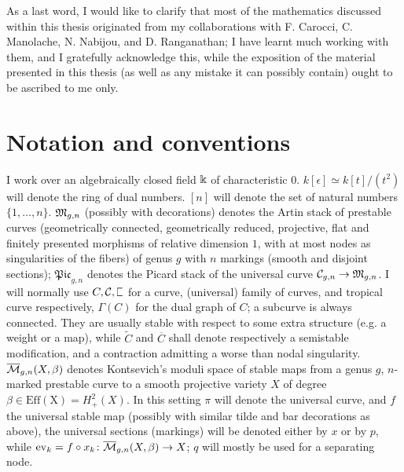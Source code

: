 As a last word, I would like to clarify that most of the mathematics discussed within this thesis originated from my collaborations with F. Carocci, C. Manolache, N. Nabijou, and D. Ranganathan; I have learnt much working with them, and I gratefully acknowledge this, while the exposition of the material presented in this thesis (as well as any mistake it can possibly contain) ought to be ascribed to me only.

\section*{Notation and conventions}
I work over an algebraically closed field $\Bbbk$ of characteristic $0$. $k[\epsilon]\simeq k[t]/(t^2)$ will denote the ring of dual numbers. $[n]$ will denote the set of natural numbers $\{1,\ldots,n\}$. $\mathfrak M_{g,n}$ (possibly with decorations) denotes the Artin stack of prestable curves (geometrically connected, geometrically reduced, projective, flat and finitely presented morphisms of relative dimension $1$, with at most nodes as singularities of the fibers) of genus $g$ with $n$ markings (smooth and disjoint sections); $\mathfrak{Pic}_{g,n}$ denotes the Picard stack of the universal curve $\mathcal C_{g,n}\rightarrow\mathfrak M_{g,n}$. I will normally use $C,\mathcal C,\plC$ for a curve, (universal) family of curves, and tropical curve respectively, $\Gamma(C)$ for the dual graph of $C$; a subcurve is always connected. They are usually stable with respect to some extra structure (e.g. a weight or a map), while $\widetilde{C}$ and $\overline{C}$ shall denote respectively a semistable modification, and a contraction admitting a worse than nodal singularity. $\overline{\mathcal{M}}_{g,n}(X,\beta)$ denotes Kontsevich's moduli space of stable maps from a genus $g$, $n$-marked prestable curve to a smooth projective variety $X$ of degree $\beta\in\operatorname{Eff(X)}=H^2_+(X)$. In this setting $\pi$ will denote the universal curve, and $f$ the universal stable map (possibly with similar tilde and bar decorations as above), the universal sections (markings) will be denoted either by $x$ or by $p$, while $\operatorname{ev}_k=f\circ x_k\colon \overline{\mathcal{M}}_{g,n}(X,\beta)\rightarrow X$; $q$ will mostly be used for a separating node.
